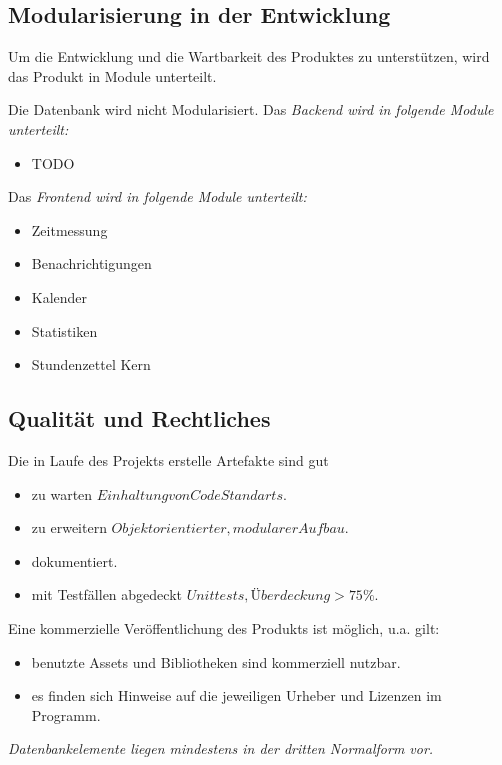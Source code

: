 \subsection{Modularisierung in der Entwicklung}

\begin{requirements}
     Um die Entwicklung und die Wartbarkeit des Produktes zu unterstützen, wird das Produkt in Module unterteilt.
    \begin{requirements}
         Die Datenbank wird nicht Modularisiert.
         Das \em Backend \em  wird in folgende Module unterteilt:
            \begin{itemize}
                \item TODO
            \end{itemize}
         Das \em Frontend \em  wird in folgende Module unterteilt:
            \begin{itemize}
                \item Zeitmessung
                \item Benachrichtigungen
                \item Kalender
                \item Statistiken
                \item Stundenzettel Kern
            \end{itemize}
    \end{requirements}
\end{requirements}

\subsection{Qualität und Rechtliches}
\begin{requirements}
     Die in Laufe des Projekts erstelle Artefakte sind gut
    \begin{itemize}
        \item zu warten \(Einhaltung von Code Standarts\).
        \item zu erweitern \(Objektorientierter, modularer Aufbau.\)
        \item dokumentiert.
        \item mit Testfällen abgedeckt \(Unittests, Überdeckung > 75\%\).
    \end{itemize}
     Eine kommerzielle Veröffentlichung des Produkts ist möglich, u.a. gilt:
    \begin{itemize}
        \item benutzte Assets und Bibliotheken sind kommerziell nutzbar.
    	\item es finden sich Hinweise auf die jeweiligen Urheber und Lizenzen im Programm.
    \end{itemize}
     \em Datenbankelemente \em  liegen mindestens in der dritten Normalform vor.
\end{requirements}
